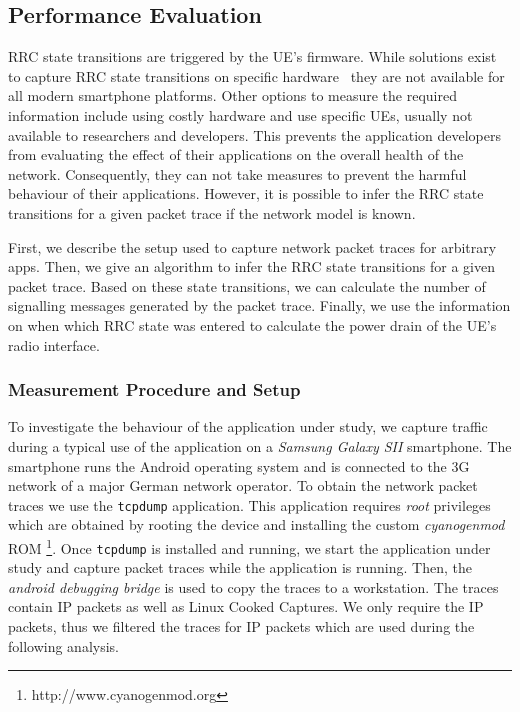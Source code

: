 \subsection{Performance Evaluation}\label{sec:network:network_traces:performance_evaluation}
\gls{RRC} state transitions are triggered by the \gls{UE}’s firmware.
While solutions exist to capture RRC state transitions on specific hardware~\cite{zayas2010} they are not available for all modern smartphone platforms.
Other options to measure the required information include using costly hardware and use specific \glspl{UE}, usually not available to researchers and developers.
This prevents the application developers from evaluating the effect of their applications on the overall health
of the network.
Consequently, they can not take measures to prevent the harmful behaviour of their applications.
However, it is possible to infer the \gls{RRC} state transitions for a given packet trace if the network model is known.

First, we describe the setup used to capture network packet traces for arbitrary apps.
Then, we give an algorithm to infer the \gls{RRC} state transitions for a given packet trace.
Based on these state transitions, we can calculate the number of signalling messages generated
by the packet trace. 
Finally, we use the information on when which \gls{RRC} state was entered to calculate the power drain of the \gls{UE}’s radio interface.

\subsubsection*{Measurement Procedure and Setup}\label{sec:network:network_traces:performance_evaluation:measurement}
To investigate the behaviour of the application under study, we capture traffic during a typical use of the application on a \emph{Samsung Galaxy SII} smartphone.
The smartphone runs the Android operating system and is connected to the \gls{3G} network of a major German network operator.
To obtain the network packet traces we use the \texttt{tcpdump} application.
This application requires \emph{root} privileges which are obtained by rooting the device and installing the custom \emph{cyanogenmod} ROM \footnote{http://www.cyanogenmod.org}.
Once \texttt{tcpdump} is installed and running, we start the application under study and capture packet traces while the application is running.
Then, the \emph{android debugging bridge} is used to copy the traces to a workstation.
The traces contain \gls{IP} packets as well as Linux Cooked Captures.
We only require the \gls{IP} packets, thus we filtered the traces for \gls{IP} packets which are used during the following analysis.

